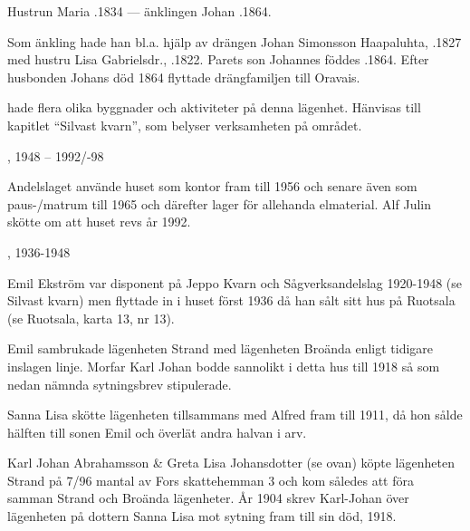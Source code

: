 Hustrun Maria .1834 --- änklingen Johan .1864.

Som änkling hade han bl.a. hjälp av drängen Johan Simonsson Haapaluhta, .1827 med hustru Lisa Gabrielsdr., .1822. Parets son Johannes föddes .1864. Efter husbonden Johans död 1864 flyttade drängfamiljen till Oravais.



%


%


 hade flera olika byggnader och aktiviteter på denna lägenhet. Hänvisas till kapitlet ``Silvast kvarn'', som belyser verksamheten på området.


, 1948 – 1992/-98

Andelslaget använde huset som kontor fram till 1956 och senare även som paus-/matrum till 1965 och därefter lager för allehanda elmaterial. Alf Julin skötte om att huset revs år 1992.


, 1936-1948

Emil Ekström var disponent på Jeppo Kvarn och Sågverksandelslag 1920-1948 (se Silvast kvarn) men flyttade in i huset först 1936 då han sålt sitt hus på Ruotsala (se Ruotsala, karta 13, nr 13).


%
Emil sambrukade lägenheten Strand med lägenheten Broända enligt tidigare inslagen linje. Morfar Karl Johan bodde sannolikt i detta hus till 1918 så som nedan nämnda sytningsbrev stipulerade.\jhvspace{}


%
Sanna Lisa skötte lägenheten tillsammans med Alfred fram till 1911,	då hon sålde hälften till sonen Emil och överlät andra halvan i arv.\jhvspace{}


%
Karl Johan Abrahamsson \& Greta Lisa Johansdotter (se ovan) köpte lägenheten Strand på 7/96 mantal av Fors skattehemman 3 och kom således att föra samman Strand och Broända lägenheter. År 1904 skrev Karl-Johan över lägenheten på dottern Sanna Lisa mot sytning fram till sin död, 1918.


